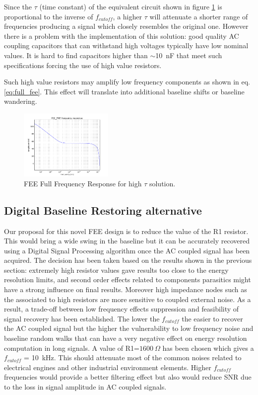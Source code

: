 \documentclass[a4paper, 10pt, oneside, twocolumn, 3p]{elsarticle}
\begin{document}
Since the $\tau$ (time constant) of the equivalent circuit shown in figure \ref{fig:Full_Freq_high_tau} is proportional to the inverse of $f_{cutoff}$, a higher $\tau$ will attenuate a shorter range of frequencies producing a signal which closely resembles the original one. However there is a problem with the implementation of this solution: good quality AC coupling capacitors that can withstand high voltages typically have low nominal values. It is hard to find capacitors higher than $\sim$10~nF that meet such specifications forcing the use of high value resistors. 

Such high value resistors may amplify low frequency components as shown in eq. \ref{eq:full_fee}. This effect will translate into additional baseline shifts or baseline wandering. 

\begin{figure}
	\begin{center}
		\includegraphics[width=0.4\textwidth]{./figures/tau_badidea.png}
		\caption{FEE Full Frequency Response for high $\tau$ solution.}
		\label{fig:Full_Freq_high_tau}
	\end{center}
\end{figure}

\subsection{Digital Baseline Restoring alternative}

Our proposal for this novel FEE design is to reduce the value of the R1 resistor. This would bring a wide swing in the baseline but it can be accurately recovered using a Digital Signal Processing algorithm once the AC coupled signal has been acquired. The decision has been taken based on the results shown in the previous section: extremely high resistor values gave results too close to the energy resolution limits, and second order effects related to components parasitics might have a strong influence on final results. Moreover high impedance nodes such as the associated to high resistors are more sensitive to coupled external noise. As a result, a trade-off between low frequency effects suppression and feasibility of signal recovery has been established. The lower the $f_{cutoff}$ the easier to recover the AC coupled signal but the higher the vulnerability to low frequency noise and baseline random walks that can have a very negative effect on energy resolution computation in long signals. A value of R1=$1600~\Omega$ has been chosen which gives a $f_{cutoff}$ = 10~kHz. This should attenuate most of the common noises related to electrical engines and other industrial environment elements. Higher $f_{cutoff}$ frequencies would provide a better filtering effect but also would reduce SNR due to the loss in signal amplitude in AC coupled signals.
\end{document}
